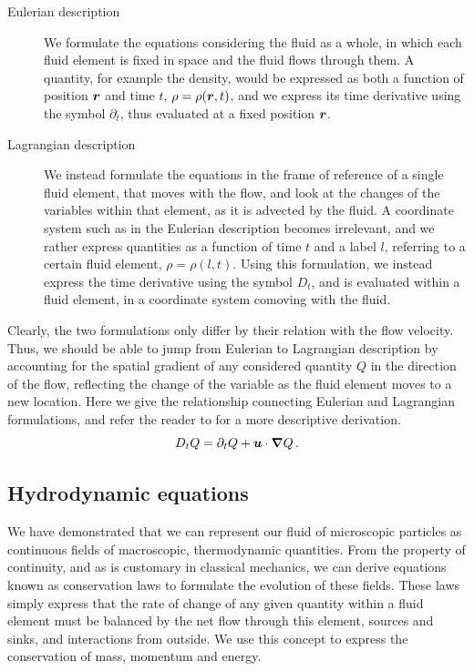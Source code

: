 \begin{description}
    \item[Eulerian description] We formulate the equations considering the fluid as a whole, in which each fluid element is fixed in space and the fluid flows through them. A quantity, for example the density, would be expressed as both a function of position \(\boldsymbol{r}\) and time \(t\), \(\rho = \rho(\boldsymbol{r}, t)\), and we express its time derivative using the symbol \(\partial_t\), thus evaluated at a fixed position \(\boldsymbol{r}\).
    
    \item[Lagrangian description] We instead formulate the equations in the frame of reference of a single fluid element, that moves with the flow, and look at the changes of the variables within that element, as it is advected by the fluid. A coordinate system such as in the Eulerian description becomes irrelevant, and we rather express quantities as a function of time \(t\) and a label \(l\), referring to a certain fluid element, \(\rho = \rho(l, t)\). Using this formulation, we instead express the time derivative using the symbol \(D_t\), and is evaluated within a fluid element, in a coordinate system comoving with the fluid.
\end{description}

Clearly, the two formulations only differ by their relation with the flow velocity. Thus, we should be able to jump from Eulerian to Lagrangian description by accounting for the spatial gradient of any considered quantity \(Q\) in the direction of the flow, reflecting the change of the variable as the fluid element moves to a new location. Here we give the relationship connecting Eulerian and Lagrangian formulations, and refer the reader to \cite{Clarke2007} for a more descriptive derivation.
\begin{equation}
    D_t Q = \partial_t Q + \boldsymbol{u} \cdot \boldsymbol{\nabla} Q \,\mathrm{.} \label{eq:eul_to_lag}
\end{equation}

\subsection{Hydrodynamic equations} \label{sec:fluid_eqs}

We have demonstrated that we can represent our fluid of microscopic particles as continuous fields of macroscopic, thermodynamic quantities. From the property of continuity, and as is customary in classical mechanics, we can derive equations known as conservation laws to formulate the evolution of these fields. These laws simply express that the rate of change of any given quantity within a fluid element must be balanced by the net flow through this element, sources and sinks, and interactions from outside. We use this concept to express the conservation of mass, momentum and energy.

